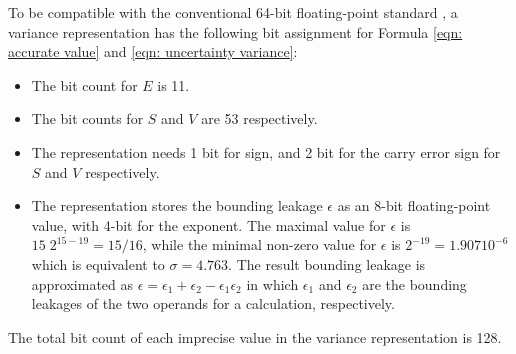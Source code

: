 \documentclass[twoside]{article}
\numberwithin{equation}{section}
\begin{document}
To be compatible with the conventional 64-bit floating-point standard \cite{Floating_Point_Standard}, a variance representation has the following bit assignment for Formula \eqref{eqn: accurate value} and \eqref{eqn: uncertainty variance}:
\begin{itemize}
\item The bit count for $E$ is 11.

\item The bit counts for $S$ and $V$ are 53 respectively.

\item The representation needs 1 bit for sign, and 2 bit for the carry error sign for $S$ and $V$ respectively.

\item The representation stores the bounding leakage $\epsilon$ as an 8-bit floating-point value, with 4-bit for the exponent.
The maximal value for $\epsilon$ is $15\;2^{15-19} = 15/16$, while the minimal non-zero value for $\epsilon$ is $2^{-19} = 1.907 10^{-6}$ which is equivalent to $\sigma=4.763$.
The result bounding leakage is approximated as $\epsilon = \epsilon_1 + \epsilon_2 - \epsilon_1 \epsilon_2$ in which $\epsilon_1$ and $\epsilon_2$ are the bounding leakages of the two operands for a calculation, respectively.
\end{itemize}
The total bit count of each imprecise value in the variance representation is 128.
\end{document}
